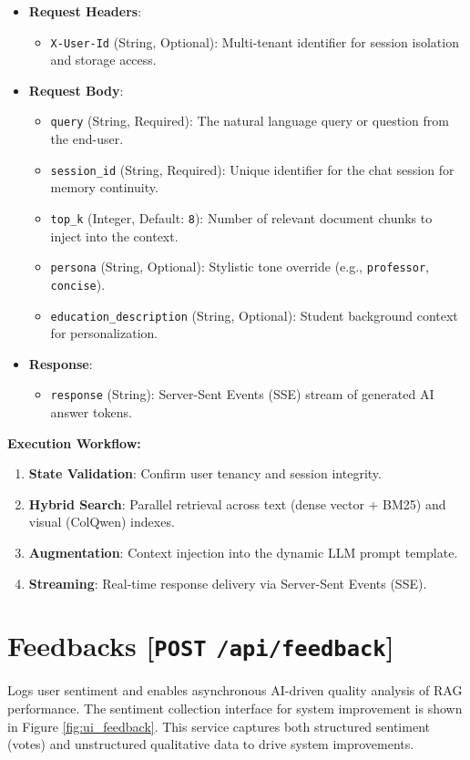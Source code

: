 \begin{itemize}
    \item \textbf{Request Headers}:
    \begin{itemize}
        \item \texttt{X-User-Id} (String, Optional): Multi-tenant identifier for session isolation and storage access.
    \end{itemize}
    \item \textbf{Request Body}:
    \begin{itemize}
        \item \texttt{query} (String, Required): The natural language query or question from the end-user.
        \item \texttt{session\_id} (String, Required): Unique identifier for the chat session for memory continuity.
        \item \texttt{top\_k} (Integer, Default: \texttt{8}): Number of relevant document chunks to inject into the context.
        \item \texttt{persona} (String, Optional): Stylistic tone override (e.g., \texttt{professor}, \texttt{concise}).
        \item \texttt{education\_description} (String, Optional): Student background context for personalization.
    \end{itemize}
    \item \textbf{Response}:
    \begin{itemize}
        \item \texttt{response} (String): Server-Sent Events (SSE) stream of generated AI answer tokens.
    \end{itemize}
\end{itemize}

\textbf{Execution Workflow:}
\begin{enumerate}
    \item \textbf{State Validation}: Confirm user tenancy and session integrity.
    \item \textbf{Hybrid Search}: Parallel retrieval across text (dense vector + BM25) and visual (ColQwen) indexes.
    \item \textbf{Augmentation}: Context injection into the dynamic LLM prompt template.
    \item \textbf{Streaming}: Real-time response delivery via Server-Sent Events (SSE).
\end{enumerate}

\section*{Feedbacks [\texttt{POST} \texttt{/api/feedback}]}
Logs user sentiment and enables asynchronous AI-driven quality analysis of RAG performance. The sentiment collection interface for system improvement is shown in Figure \ref{fig:ui_feedback}. This service captures both structured sentiment (votes) and unstructured qualitative data to drive system improvements.

